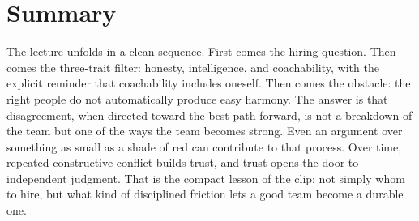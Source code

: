 \section{Summary}

The lecture unfolds in a clean sequence. First comes the hiring question. Then comes the three-trait filter: honesty, intelligence, and coachability, with the explicit reminder that coachability includes oneself. Then comes the obstacle: the right people do not automatically produce easy harmony. The answer is that disagreement, when directed toward the best path forward, is not a breakdown of the team but one of the ways the team becomes strong. Even an argument over something as small as a shade of red can contribute to that process. Over time, repeated constructive conflict builds trust, and trust opens the door to independent judgment. That is the compact lesson of the clip: not simply whom to hire, but what kind of disciplined friction lets a good team become a durable one.
